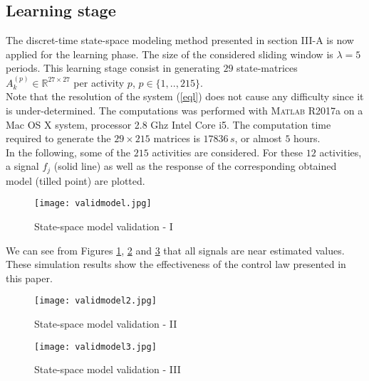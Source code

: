 \documentclass[letterpaper, 10 pt, conference]{ieeeconf}  %
\newcommand{\mR}{{\mathbb R}}
\begin{document}
\subsection{Learning stage}

The discret-time state-space modeling method presented in section III-A is now applied for the learning phase. The size of the considered sliding window is $\lambda=5$ periods. This learning stage consist in generating $29$ state-matrices $A_k^{(p)} \in \mR^{27 \times 27}$ per activity $p$, $p\in\{1,..,215\}$.\\

Note that the resolution of the system (\ref{eql}) does not cause any difficulty since it is under-determined. The computations was performed with \textsc{Matlab} R2017a on a Mac OS X system, processor 2.8 Ghz Intel Core i5. The computation time required to generate the $29 \times 215$ matrices is $17836\,s$, or almost $5$ hours.\\
In the following, some of the $215$ activities are considered. For these $12$ activities, a signal $f_j$ (solid line) as well as the response of the corresponding obtained model (tilled point) are plotted.

\begin{figure}[H]
	
		\hspace{-0.6cm}\texttt{[image: validmodel.jpg]}
		\caption{State-space model validation - I} 
		\label{fig:validmodel1}
	
\end{figure}


We can see from Figures \ref{fig:validmodel1}, \ref{fig:validmodel2} and \ref{fig:validmodel3} that all signals are near estimated values. These simulation results show the effectiveness of the control law presented in this paper.
\begin{figure}[h]
	
		\hspace{-0.3cm}\texttt{[image: validmodel2.jpg]}
		\caption{State-space model validation - II} 
		\label{fig:validmodel2}
	
\end{figure}


\begin{figure}[h]
	
		\hspace{-0.3cm}\texttt{[image: validmodel3.jpg]}
		\caption{State-space model validation - III} 
		\label{fig:validmodel3}
	
\end{figure}
\end{document}
